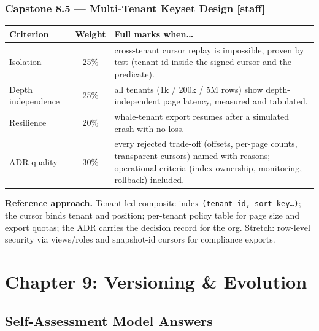 \subsubsection*{Capstone 8.5 --- Multi-Tenant Keyset Design [staff]}
\begin{center}\small
\begin{tabularx}{\textwidth}{l c X}
\toprule
\textbf{Criterion} & \textbf{Weight} & \textbf{Full marks when\ldots} \\
\midrule
Isolation & 25\% & cross-tenant cursor replay is impossible, proven by test (tenant id inside the signed cursor and the predicate). \\
Depth independence & 25\% & all tenants (1k / 200k / 5M rows) show depth-independent page latency, measured and tabulated. \\
Resilience & 20\% & whale-tenant export resumes after a simulated crash with no loss. \\
ADR quality & 30\% & every rejected trade-off (offsets, per-page counts, transparent cursors) named with reasons; operational criteria (index ownership, monitoring, rollback) included. \\
\bottomrule
\end{tabularx}
\end{center}
\textbf{Reference approach.} Tenant-led composite index
\texttt{(tenant\_id, sort key\ldots)}; the cursor binds tenant and
position; per-tenant policy table for page size and export quotas; the ADR
carries the decision record for the org. Stretch: row-level security via
views/roles and snapshot-id cursors for compliance exports.

\section{Chapter 9: Versioning \& Evolution}
\label{sec:sol-ch9}

\subsection{Self-Assessment Model Answers}

